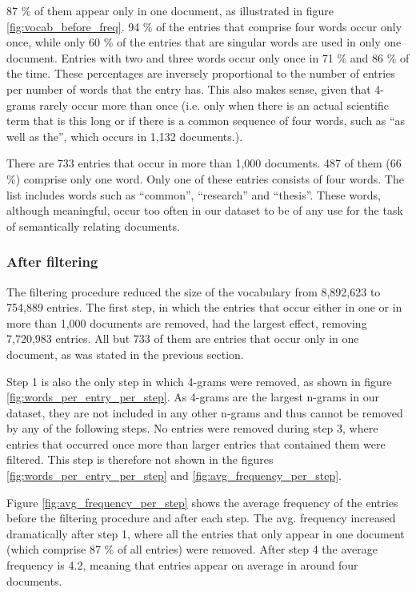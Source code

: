 87 \% of them appear only in one document, as illustrated in figure \ref{fig:vocab_before_freq}. 94 \% of the entries that comprise four words occur only once, while only 60 \% of the entries that are singular words are used in only one document. Entries with two and three words occur only once in 71 \% and 86 \% of the time. These percentages are inversely proportional to the number of entries per number of words that the entry has. This also makes sense, given that 4-grams rarely occur more than once (i.e. only when there is an actual scientific term that is this long or if there is a common sequence of four words, such as ``as well as the'', which occurs in 1,132 documents.).

There are 733 entries that occur in more than 1,000 documents. 487 of them (66 \%) comprise only one word. Only one of these entries consists of four words. The list includes words such as ``common'', ``research'' and ``thesis''. These words, although meaningful, occur too often in our dataset to be of any use for the task of semantically relating documents.

\subsubsection{After filtering}

The filtering procedure reduced the size of the vocabulary from 8,892,623 to 754,889 entries. The first step, in which the entries that occur either in one or in more than 1,000 documents are removed, had the largest effect, removing 7,720,983 entries. All but 733 of them are entries that occur only in one document, as was stated in the previous section.

Step 1 is also the only step in which 4-grams were removed, as shown in figure \ref{fig:words_per_entry_per_step}. As 4-grams are the largest n-grams in our dataset, they are not included in any other n-grams and thus cannot be removed by any of the following steps. No entries were removed during step 3, where entries that occurred once more than larger entries that contained them were filtered. This step is therefore not shown in the figures \ref{fig:words_per_entry_per_step} and \ref{fig:avg_frequency_per_step}. 

Figure \ref{fig:avg_frequency_per_step} shows the average frequency of the entries before the filtering procedure and after each step. The avg. frequency increased dramatically after step 1, where all the entries that only appear in one document (which comprise 87 \% of all entries) were removed. After step 4 the average frequency is 4.2, meaning that entries appear on average in around four documents.

